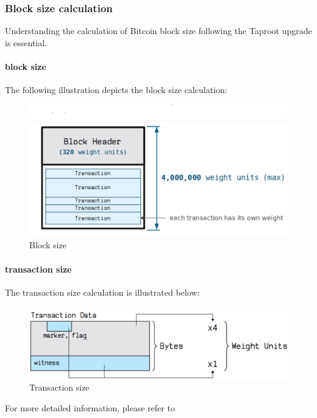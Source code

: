 \subsubsection{Block size calculation}
Understanding the calculation of Bitcoin block size following the Taproot upgrade is essential.

\paragraph{block size} 

The following illustration depicts the block size calculation:

\begin{figure}[ht] 
    \centering  
    \includegraphics[width=0.85\columnwidth]{images/block-size.png} 
    \caption{Block size}
    \label{fig:block-size}
\end{figure}

\paragraph*{transaction size} 

The transaction size calculation is illustrated below:

\begin{figure}[ht] 
    \centering  
    \includegraphics[width=0.85\columnwidth]{images/transaction-size.png} 
    \caption{Transaction size}
    \label{fig:transaction-size}
\end{figure}

For more detailed information, please refer to \cite{website:transaction-size}


